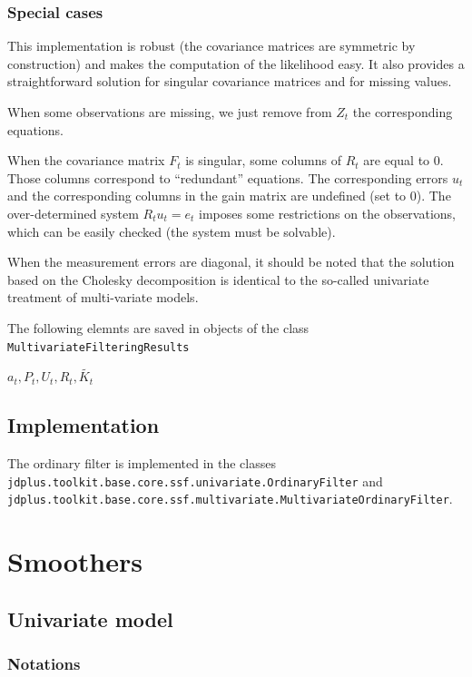 \documentclass[
  letterpaper,
  DIV=11,
  numbers=noendperiod]{scrreprt}
\begin{document}
\subsubsection{Special cases}\label{special-cases}

This implementation is robust (the covariance matrices are symmetric by
construction) and makes the computation of the likelihood easy. It also
provides a straightforward solution for singular covariance matrices and
for missing values.

When some observations are missing, we just remove from \(Z_t\) the
corresponding equations.

When the covariance matrix \(F_t\) is singular, some columns of \(R_t\)
are equal to 0. Those columns correspond to ``redundant'' equations. The
corresponding errors \(u_t\) and the corresponding columns in the gain
matrix are undefined (set to 0). The over-determined system
\(R_t u_t = e_t\) imposes some restrictions on the observations, which
can be easily checked (the system must be solvable).

When the measurement errors are diagonal, it should be noted that the
solution based on the Cholesky decomposition is identical to the
so-called univariate treatment of multi-variate models.

The following elemnts are saved in objects of the class
\texttt{MultivariateFilteringResults}

\(a_t, P_t, U_t, R_t, \tilde{K_t}\)

\subsection{Implementation}\label{implementation-3}

The ordinary filter is implemented in the classes
\texttt{jdplus.toolkit.base.core.ssf.univariate.OrdinaryFilter} and
\texttt{jdplus.toolkit.base.core.ssf.multivariate.MultivariateOrdinaryFilter}.

\section{Smoothers}\label{smoothers}

\subsection{Univariate model}\label{univariate-model-1}

\subsubsection{Notations}\label{notations}
\end{document}
